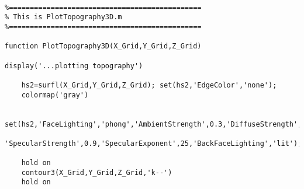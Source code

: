 \lstset{basicstyle=\footnotesize\ttfamily}
    
\begin{lstlisting}[breaklines]

%==============================================
% This is PlotTopography3D.m
%==============================================

function PlotTopography3D(X_Grid,Y_Grid,Z_Grid)

display('...plotting topography')

    hs2=surfl(X_Grid,Y_Grid,Z_Grid); set(hs2,'EdgeColor','none');
    colormap('gray')
    
    set(hs2,'FaceLighting','phong','AmbientStrength',0.3,'DiffuseStrength',0.8,...
        'SpecularStrength',0.9,'SpecularExponent',25,'BackFaceLighting','lit');
    
    hold on
    contour3(X_Grid,Y_Grid,Z_Grid,'k--')
    hold on
    
    \end{lstlisting}